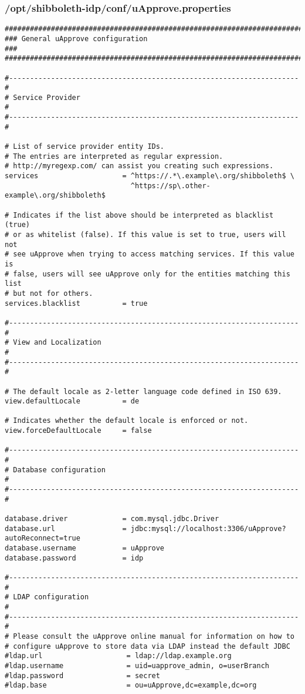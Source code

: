 \subsubsection{/opt/shibboleth-idp/conf/uApprove.properties}
\begin{lstlisting}
#######################################################################
### General uApprove configuration                                  ###
#######################################################################

#---------------------------------------------------------------------#
# Service Provider                                                    #
#---------------------------------------------------------------------#

# List of service provider entity IDs.
# The entries are interpreted as regular expression.
# http://myregexp.com/ can assist you creating such expressions.
services                    = ^https://.*\.example\.org/shibboleth$ \
                              ^https://sp\.other-example\.org/shibboleth$

# Indicates if the list above should be interpreted as blacklist (true)
# or as whitelist (false). If this value is set to true, users will not
# see uApprove when trying to access matching services. If this value is
# false, users will see uApprove only for the entities matching this list
# but not for others.
services.blacklist          = true

#---------------------------------------------------------------------#
# View and Localization                                               #
#---------------------------------------------------------------------#

# The default locale as 2-letter language code defined in ISO 639.
view.defaultLocale          = de

# Indicates whether the default locale is enforced or not.
view.forceDefaultLocale     = false

#---------------------------------------------------------------------#
# Database configuration                                              #
#---------------------------------------------------------------------#

database.driver             = com.mysql.jdbc.Driver
database.url                = jdbc:mysql://localhost:3306/uApprove?autoReconnect=true
database.username           = uApprove
database.password           = idp

#---------------------------------------------------------------------#
# LDAP configuration                                        	      #
#---------------------------------------------------------------------#
# Please consult the uApprove online manual for information on how to 
# configure uApprove to store data via LDAP instead the default JDBC
#ldap.url                    = ldap://ldap.example.org
#ldap.username               = uid=uapprove_admin, o=userBranch
#ldap.password               = secret
#ldap.base                   = ou=uApprove,dc=example,dc=org


\end{lstlisting}

